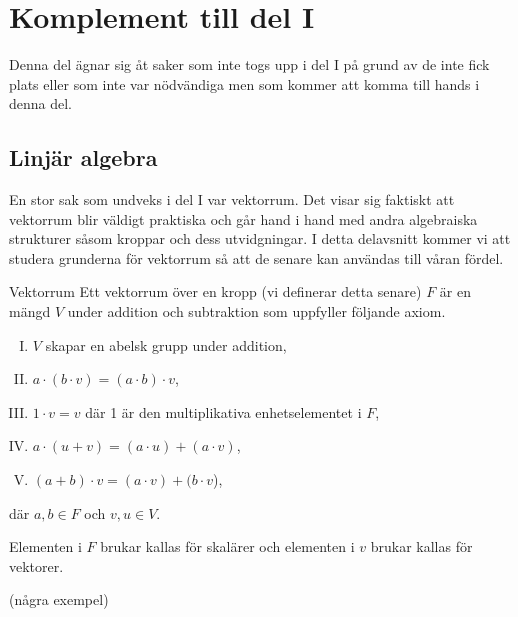 \documentclass{article}
\theoremstyle{definition}
\begin{document}
\section{Komplement till del I}
Denna del ägnar sig åt saker som inte togs upp i del I på grund av de inte fick plats eller som inte var nödvändiga men som kommer att komma 
till hands i denna del.

\subsection{Linjär algebra}
En stor sak som undveks i del I var vektorrum. Det visar sig faktiskt att vektorrum blir väldigt praktiska och går hand i hand med andra 
algebraiska strukturer såsom kroppar och dess utvidgningar. I detta delavsnitt kommer vi att studera grunderna för vektorrum så att de senare kan användas till 
våran fördel.

\begin{mydef}{Vektorrum}{}
  Ett vektorrum över en kropp (vi definerar detta senare) $F$ är en mängd $V$ under addition och subtraktion som uppfyller följande axiom.
  \begin{enumerate}[I)]
    \item $V$ skapar en abelsk grupp under addition,
    \item $a \cdot (b \cdot v) = (a \cdot b) \cdot v$,
    \item $1 \cdot v = v$ där 1 är den multiplikativa enhetselementet i $F$,
    \item $a \cdot (u + v) = (a \cdot u) + (a \cdot v)$,
    \item $(a + b) \cdot v = (a \cdot v) + (b \cdot v$),
  \end{enumerate}
  där $a, b \in F$ och $v, u \in V$.
\end{mydef}
Elementen i $F$ brukar kallas för skalärer och elementen i $v$ 
brukar kallas för vektorer. 

(några exempel)
\end{document}
